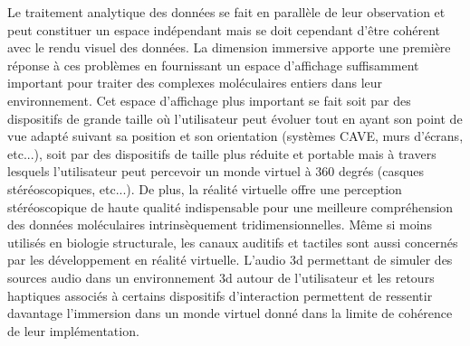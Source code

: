 Le traitement analytique des données se fait en parallèle de leur observation et peut constituer un espace indépendant mais se doit cependant d'être cohérent avec le rendu visuel des données. La dimension immersive apporte une première réponse à ces problèmes en fournissant un espace d'affichage suffisamment important pour traiter des complexes moléculaires entiers dans leur environnement. Cet espace d'affichage plus important se fait soit par des dispositifs de grande taille où l'utilisateur peut évoluer tout en ayant son point de vue adapté suivant sa position et son orientation (systèmes CAVE, murs d'écrans, etc...), soit par des dispositifs de taille plus réduite et portable mais à travers lesquels l'utilisateur peut percevoir un monde virtuel à 360 degrés (casques stéréoscopiques, etc...). De plus, la réalité virtuelle offre une perception stéréoscopique de haute qualité indispensable pour une meilleure compréhension des données moléculaires intrinsèquement tridimensionnelles. Même si moins utilisés en biologie structurale, les canaux auditifs et tactiles sont aussi concernés par les développement en réalité virtuelle. L'audio 3d permettant de simuler des sources audio dans un environnement 3d autour de l'utilisateur et les retours haptiques associés à certains dispositifs d'interaction permettent de ressentir davantage l'immersion dans un monde virtuel donné dans la limite de cohérence de leur implémentation. 

